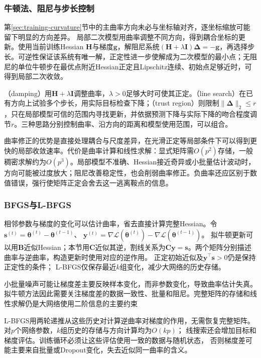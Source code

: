 \subsubsection{牛顿法、阻尼与步长控制}
\label{sec:training-second-order}

第\ref{sec:training-curvature}节中的主曲率方向未必与坐标轴对齐，逐坐标缩放可能留下明显的方向差异。
局部二次模型用曲率调整不同方向，得到耦合坐标的更新。使用当前训练Hessian $\bm H$与梯度$\bm g$，解阻尼系统$(\bm H+\lambda\bm I)\bm\Delta=-\bm g$，再选择步长。可逆性保证该系统有唯一解，正定性进一步使解成为二次模型的最小点；无阻尼的单位牛顿步在最优点附近Hessian正定且Lipschitz连续、初始点足够近时，可得到局部二次收敛。

（damping）用$\bm H+\lambda\bm I$调整曲率，$\lambda>0$足够大时可使其正定。（line search）在已有方向上试验多个步长，用实际目标检查下降；（trust region）则限制$\lVert\bm\Delta\rVert_2\leq r$，只在局部模型可信的范围内寻找更新，并依据预测下降与实际下降的吻合程度调节$r$。三种思路分别控制曲率、沿方向的距离和模型使用范围，可以组合。

曲率修正的优势是直接处理耦合与尺度差异，在光滑正定等局部条件下可以得到更快的局部收敛速率。代价是曲率计算和线性求解：显式矩阵需$O(p^2)$存储，一般稠密求解约为$O(p^3)$。局部模型不准确、Hessian接近奇异或小批量估计波动时，方向可能被过度放大；阻尼改善稳定性，也会削弱曲率修正。负曲率还应区别于数值错误，强行使矩阵正定会舍去这一逃离鞍点的信息。

\subsubsection{BFGS与L-BFGS}
\label{sec:training-quasi-newton}

相邻参数与梯度的变化可以估计曲率，省去直接计算完整Hessian。令$\bm s^{(t)}=\bm\theta^{(t)}-\bm\theta^{(t-1)}$、
$\bm y^{(t)}=\nabla\mathcal L(\bm\theta^{(t)})-\nabla\mathcal L(\bm\theta^{(t-1)})$。
拟牛顿更新可以用$\bm B$近似Hessian；本节用$\bm C$近似其逆，割线关系为$\bm C\bm y=\bm s$。两个矩阵分别描述曲率与逆曲率，构造更新时使用对应的逆作用。
正定初始近似及$\bm y^\top\bm s>0$仍是保持正定性的条件；
L-BFGS仅保存最近$k$组变化，减少大网络的历史存储。

小批量噪声可能让梯度差主要反映样本变化，而非参数变化，导致曲率估计失真。拟牛顿方法因此需要关注梯度差的数据一致性、批量和阻尼。完整矩阵的存储和线性求解仍是大网络使用二阶信息的主要约束

L-BFGS用两轮递推从这些历史对计算逆曲率对梯度的作用，无需恢复完整矩阵。
对$p$个网络参数，$k$组历史的存储与方向计算均为$O(kp)$；
线搜索还会增加目标和梯度评估。训练循环必须让这些评估使用一致的数据与随机状态，
否则梯度差可能主要来自批量或Dropout变化，失去近似同一曲率的含义。

